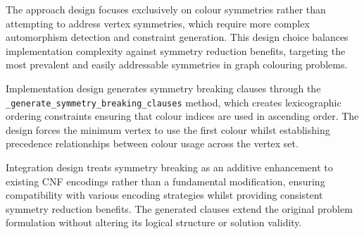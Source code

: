 The approach design focuses exclusively on colour symmetries rather than attempting to address vertex symmetries, which require more complex automorphism detection and constraint generation. This design choice balances implementation complexity against symmetry reduction benefits, targeting the most prevalent and easily addressable symmetries in graph colouring problems.

Implementation design generates symmetry breaking clauses through the \texttt{\_generate\_\-symmetry\_\-breaking\_clauses} method, which creates lexicographic ordering constraints ensuring that colour indices are used in ascending order. The design forces the minimum vertex to use the first colour whilst establishing precedence relationships between colour usage across the vertex set.

Integration design treats symmetry breaking as an additive enhancement to existing CNF encodings rather than a fundamental modification, ensuring compatibility with various encoding strategies whilst providing consistent symmetry reduction benefits. The generated clauses extend the original problem formulation without altering its logical structure or solution validity.